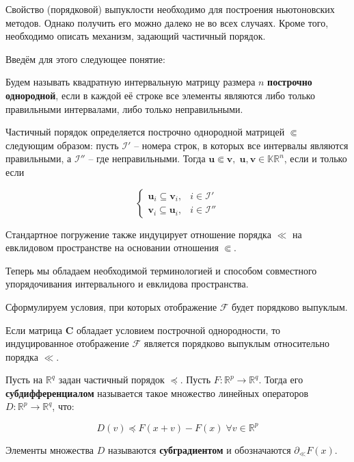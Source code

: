 Свойство (порядковой) выпуклости необходимо для построения ньютоновских методов. Однако получить его можно далеко не во всех случаях. Кроме того, необходимо описать механизм, задающий частичный порядок.

Введём для этого следующее понятие:

\begin{definition}
	Будем называть квадратную интервальную матрицу размера $n$ \textbf{построчно однородной}, если в каждой её строке все элементы являются либо только правильными интервалами, либо только неправильными.
\end{definition}

Частичный порядок определяется построчно однородной матрицей $\Subset$ следующим образом: пусть $\mathcal{I}'$ -- номера строк, в которых все интервалы являются правильными, а $\mathcal{I}''$ -- где неправильными. Тогда $\mathbf{u} \Subset \mathbf{v}, \; \mathbf{u, v} \in \mathbb{KR}^n$, если и только если

\begin{equation}
\begin{cases}
\mathbf{u}_i \subseteq \mathbf{v}_i, & i \in \mathcal{I}' \\

\mathbf{v}_i \subseteq \mathbf{u}_i, & i \in \mathcal{I}''

\end{cases} 
\end{equation}

Стандартное погружение также индуцирует отношение порядка $\ll$ на евклидовом пространстве на основании отношения $\Subset$.

Теперь мы обладаем необходимой терминологией и способом совместного упорядочивания интервального и евклидова пространства.

Сформулируем условия, при которых отображение $\mathcal{F}$ будет порядково выпуклым.

\begin{theorem}
	Если матрица $\mathbf{C}$ обладает условием построчной однородности, то индуцированное отображение $\mathcal{F}$ является порядково выпуклым относительно порядка $\ll$.
\end{theorem}

\begin{definition}
	Пусть на $\mathbb{R}^q$ задан частичный порядок $\preccurlyeq$. Пусть   $F: \mathbb{R}^p \rightarrow \mathbb{R}^q$. Тогда его \textbf{субдифференциалом} называется такое множество линейных операторов $D: \mathbb{R}^p \rightarrow \mathbb{R}^q$, что:
	
	\begin{equation}
	D(v) \preccurlyeq F(x + v) - F(x) \; \forall v \in \mathbb{R}^p
	\end{equation}
	
	Элементы множества $D$ называются \textbf{субградиентом} и обозначаются $\partial_{\ll}F(x)$.
\end{definition}


